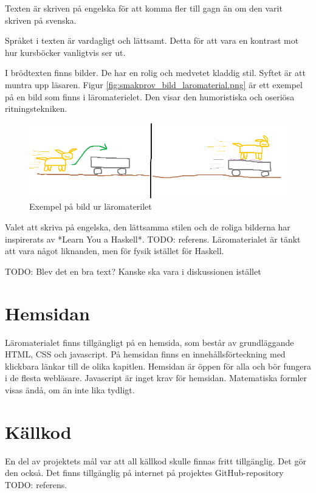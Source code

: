 \begin{binge}
Texten är skriven på engelska för att komma fler till gagn än om den varit skriven på svenska.

Språket i texten är vardagligt och lättsamt. Detta för att vara en kontrast mot hur kursböcker vanligtvis ser ut.

I brödtexten finns bilder. De har en rolig och medvetet kladdig stil. Syftet är att muntra upp läsaren. Figur \ref{fig:smakprov_bild_laromaterial.png} är ett exempel på en bild som finns i läromaterielet. Den visar den humoristiska och oseriösa ritningstekniken.

\begin{figure}
  \includegraphics[width=\linewidth]{figure/smakprov_bild_laromaterial.png}
  \caption{Exempel på bild ur läromaterilet}
  \label{fig:smakprov_bild_laromaterial}
\end{figure}

Valet att skriva på engelska, den lättsamma stilen och de roliga bilderna har inspirerats av *Learn You a Haskell*. TODO: referens. Läromaterialet är tänkt att vara något liknanden, men för fysik istället för Haskell.

TODO: Blev det en bra text? Kanske ska vara i diskussionen istället

\section{Hemsidan}

Läromaterialet finns tillgängligt på en hemsida, som består av grundläggande HTML, CSS och javascript. På hemsidan finns en innehållsförteckning med klickbara länkar till de olika kapitlen. Hemsidan är öppen för alla och bör fungera i de flesta webläsare. Javascript är inget krav för hemsidan. Matematiska formler visas ändå, om än inte lika tydligt.

\section{Källkod}

En del av projektets mål var att all källkod skulle finnas fritt tillgänglig. Det gör den också. Det finns tillgänglig på internet på projektes GitHub-repository TODO: referens.


\end{binge}
